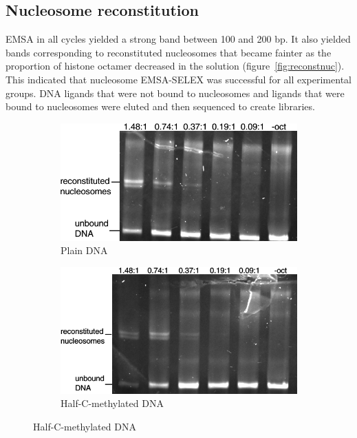 \documentclass[parskip=full, numbers=noenddot]{scrbook}
\begin{document}
\subsection{Nucleosome reconstitution}
\label{ssec:reconstnuc}

EMSA in all cycles yielded a strong band between 100 and 200 bp. It also yielded bands corresponding to reconstituted nucleosomes that became fainter as the proportion of histone octamer decreased in the solution (figure~\ref{fig:reconstnuc}).  This indicated that nucleosome EMSA-SELEX was successful for all experimental groups.  DNA ligands that were not bound to nucleosomes and ligands that were bound to nucleosomes were eluted and then sequenced to create libraries.

\begin{figure}[h]
  \centering
  \begin{subfigure}[htpb]{0.4\textwidth}
    \centering
    \includegraphics[width=\textwidth]{reconstnuc_a}
    \caption{Plain DNA}
    \label{fig:reconstnuc_a}
  \end{subfigure}
  \begin{subfigure}[htpb]{0.4\textwidth}
    \centering
    \includegraphics[width=\textwidth]{reconstnuc_b}
    \caption{Half-C-methylated DNA}

\end{subfigure}
\end{figure}
\end{document}

